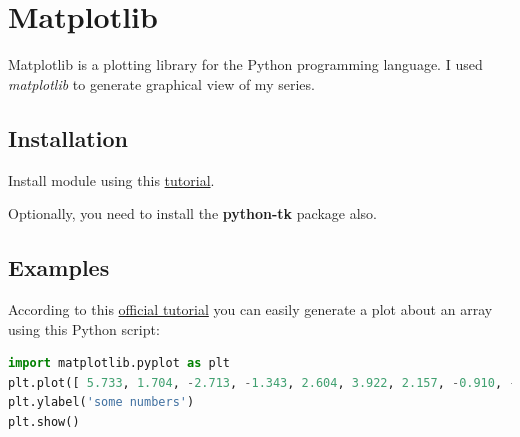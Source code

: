 \documentclass[12pt, a4paper, portrait]{article}
\begin{document}
\pagebreak
\section{Matplotlib}
Matplotlib is a plotting library for the Python programming language.
I used \textit{matplotlib} to generate graphical view of my series.
\subsection{Installation}
Install module using this \href{https://matplotlib.org/users/installing.html#linux-using-your-package-manager}{tutorial}.
\par Optionally, you need to install the \textbf{python-tk} package also.
\subsection{Examples}
According to this \href{https://matplotlib.org/users/pyplot_tutorial.html}{official tutorial} you can easily generate a plot about an array using this Python script:
\begin{lstlisting}[language=Python]
import matplotlib.pyplot as plt
plt.plot([ 5.733, 1.704, -2.713, -1.343, 2.604, 3.922, 2.157, -0.910, -2.414, -2.943, -1.526, -0.823])
plt.ylabel('some numbers')
plt.show()
\end{lstlisting}
\end{document}
